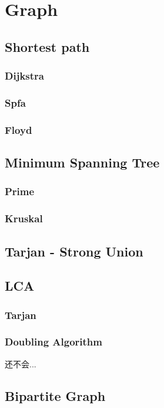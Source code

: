 \section{Graph}
	\subsection{Shortest path}
		\subsubsection{Dijkstra}
			
		\subsubsection{Spfa}
			
		\subsubsection{Floyd}
			
	\subsection{Minimum Spanning Tree}
		\subsubsection{Prime}
			
		\subsubsection{Kruskal}
			
	\subsection{Tarjan - Strong Union}
		
	\subsection{LCA}
		\subsubsection{Tarjan}
			
		\subsubsection{Doubling Algorithm}
			还不会...
	\subsection{Bipartite Graph}
